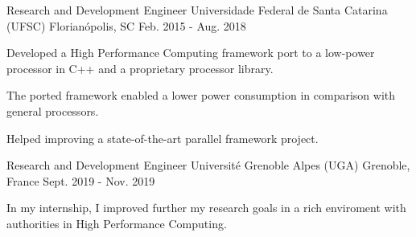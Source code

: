 

\begin{cventries}

  \cventry
    {Research and Development Engineer} %
    {Universidade Federal de Santa Catarina (UFSC)} %
    {Florianópolis, SC} %
    {Feb. 2015 - Aug. 2018} %
    {
      \begin{cvitems} %
        \item {Developed a High Performance Computing framework port to a low-power processor in C++ and a proprietary processor library.}
        \item {The ported framework enabled a lower power consumption in
          comparison with general processors.}
        \item {Helped improving a state-of-the-art parallel framework project.}
      \end{cvitems}
    }

  \cventry
    {Research and Development Engineer} %
    {Université Grenoble Alpes (UGA)} %
    {Grenoble, France} %
    {Sept. 2019 - Nov. 2019} %
    {
      \begin{cvitems} %
      \item {In my internship, I improved further my research goals in a rich
        enviroment with authorities in High Performance Computing.}
      \end{cvitems}
    }


\end{cventries}
